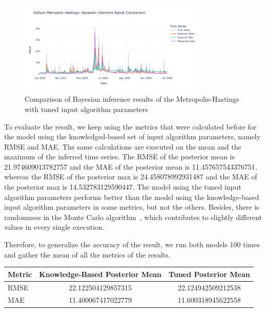 \begin{figure}[H]
    \centering
    \includegraphics[width=0.8\textwidth] {figures/basic_mh/tuned_mh/tuned_mh_bayes.png}
    \captionsetup{width=.8\textwidth}
    \caption{Comparison of Bayesian inference results of the Metropolis-Hastings with tuned input algorithm parameters}
    \label{fig:enter-label}
\end{figure}

To evaluate the result, we keep using the metrics that were calculated before for the model using the knowledged-based set of input algorithm parameters, namely RMSE and MAE. The same calculations are executed on the mean and the maximum of the inferred time series. The RMSE of the posterior mean is 21.974609013782757 and the MAE of the posterior mean is 11.457657543376751, whereas the RMSE of the posterior max is 24.458078992931487 and the MAE of the posterior max is 14.532783129590447. The model using the tuned input algorithm parameters performs better than the model using the knowledge-based input algorithm parameters in some metrics, but not the others. Besides, there is randomness in the Monte Carlo algorithm~\cite{monte_carlo_randomness}, which contributes to slightly different values in every single execution.

Therefore, to generalize the accuracy of the result, we run both models 100 times and gather the mean of all the metrics of the results.

\begin{center}
\begin{tabular}{@{}lcc@{}}
\toprule
\textbf{Metric} & \textbf{Knowledge-Based Posterior Mean} & \textbf{Tuned Posterior Mean} \\ \midrule
RMSE            & 22.122504129857315               & 22.124942509212538                  \\
MAE             & 11.400067417022779               & 11.600318945622558              \\ \bottomrule
\end{tabular}
\end{center}




